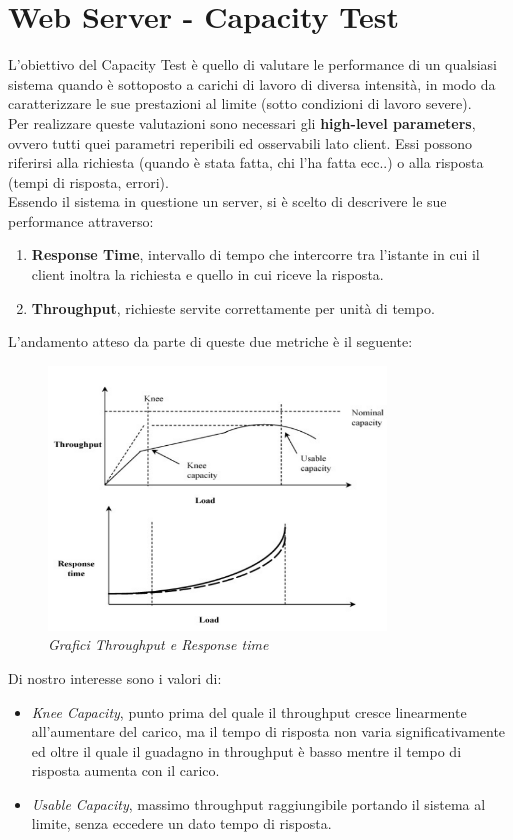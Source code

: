 \chapter{Web Server - Capacity Test}
L'obiettivo del Capacity Test è quello di valutare le performance di un qualsiasi sistema quando è sottoposto a carichi di lavoro di diversa intensità, in modo da caratterizzare le sue prestazioni al limite (sotto condizioni di lavoro severe).
\\
Per realizzare queste valutazioni sono necessari gli \textbf{high-level parameters}, ovvero tutti quei parametri reperibili ed osservabili lato client. Essi possono riferirsi alla richiesta (quando è stata fatta, chi l'ha fatta ecc..) o alla risposta (tempi di risposta, errori).
\\
Essendo il sistema in questione un server, si è scelto di descrivere le sue performance attraverso:
\begin{enumerate}
	\item \textbf{Response Time}, intervallo di tempo che intercorre tra l'istante in cui il client inoltra la richiesta e quello in cui riceve la risposta.
	\item \textbf{Throughput}, richieste servite correttamente per unità di tempo.
\end{enumerate}
L'andamento atteso da parte di queste due metriche è il seguente:
\begin{figure}[H]
	\centering
	\includegraphics[width=0.8\textwidth]{img/hw2/Thr_resp.png}
	\caption{\textit{Grafici Throughput e Response time}}
\end{figure}
Di nostro interesse sono i valori di:
\begin{itemize}
	\item \textit{Knee Capacity}, punto prima del quale il throughput cresce linearmente all'aumentare del carico, ma il tempo di risposta non varia significativamente ed oltre il quale il guadagno in throughput è basso mentre il tempo di risposta aumenta con il carico.
	\item \textit{Usable Capacity}, massimo throughput raggiungibile portando il sistema al limite, senza eccedere un dato tempo di risposta.
\end{itemize}
